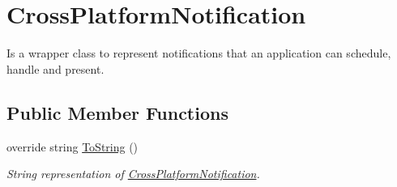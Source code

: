 \hypertarget{class_voxel_busters_1_1_native_plugins_1_1_cross_platform_notification}{}\section{Cross\+Platform\+Notification}
\label{class_voxel_busters_1_1_native_plugins_1_1_cross_platform_notification}


Is a wrapper class to represent notifications that an application can schedule, handle and present.  


\subsection*{Public Member Functions}
\begin{DoxyCompactItemize}
\item 
override string \hyperlink{class_voxel_busters_1_1_native_plugins_1_1_cross_platform_notification_aa73e7c4dd1df5fd5fbf81c7764ee1533}{To\+String} ()
\begin{DoxyCompactList}\small\item\em String representation of \hyperlink{class_voxel_busters_1_1_native_plugins_1_1_cross_platform_notification}{Cross\+Platform\+Notification}. \end{DoxyCompactList}\end{DoxyCompactItemize}
